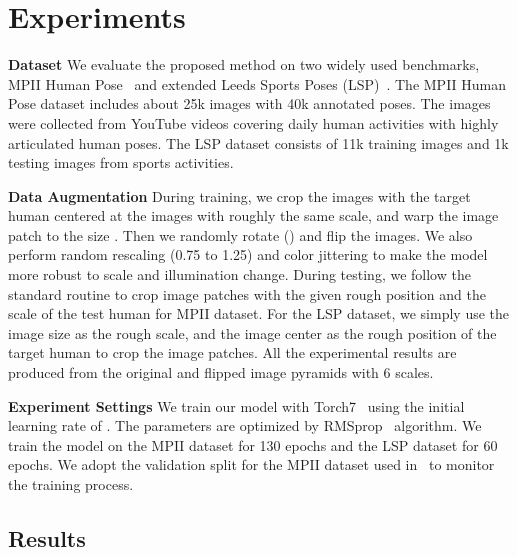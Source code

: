 \documentclass[10pt,twocolumn,letterpaper]{article}
\newcommand{\smalltitle}[1]{\vspace{0.2em}\noindent \textbf{{#1}}}
\begin{document}
\section{Experiments}


\smalltitle{Dataset}
We evaluate the proposed method on two widely used benchmarks, MPII Human Pose~\cite{andriluka20142d} and extended Leeds Sports Poses  (LSP)~\cite{johnson2010clustered}. The MPII Human Pose dataset includes about 25k images with 40k annotated poses. The images were collected from YouTube videos covering daily human activities with highly articulated human poses. The LSP dataset consists of 11k training images and 1k testing images from sports activities. 

\smalltitle{Data Augmentation} During training, we crop the images with the target human centered at the images with roughly the same scale, and warp the image patch to the size . Then we randomly rotate () and flip the images. We also perform random rescaling (0.75 to 1.25) and color jittering to make the model more robust to scale and illumination change. During testing, we follow the standard routine to crop image patches with the given rough position and the scale of the test human for MPII dataset. For the LSP dataset, we simply use the image size as the rough scale, and the image center as the rough position of the target human to crop the image patches. All the experimental results are produced from the original and flipped image pyramids with 6 scales.

\smalltitle{Experiment Settings} We train our model with Torch7~\cite{collobert2011torch7} using the initial learning rate of . The parameters are optimized by RMSprop~\cite{tieleman2012lecture} algorithm. We train the model on the MPII dataset for 130 epochs and the LSP dataset for 60 epochs. We adopt the validation split for the MPII dataset used in~\cite{tompson2015efficient} to monitor the training process. 


\subsection{Results}
\end{document}
